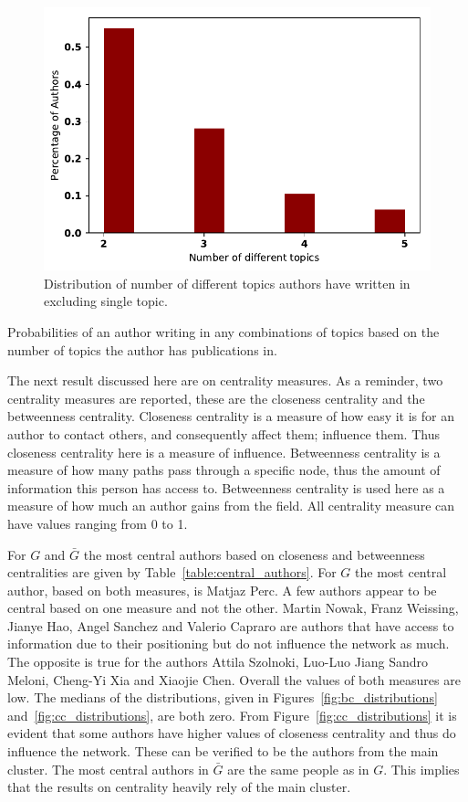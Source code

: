 \documentclass{article}
\theoremstyle{definition}
\begin{document}
\begin{figure}[!hbtp]
    \centering
    \includegraphics[width=.45\textwidth]{./assets/images/percentage_of_authors_different_topic.pdf}
    \caption{Distribution of number of different topics authors have written in
    excluding single topic.}
    \label{fig:different_topics_per_author}
\end{figure}

\begin{table}[!htbp]
    \begin{center}
    \resizebox{.55\textwidth}{!}{}
\end{center}
\caption{Probabilities of an author writing in any combinations of
topics based on the number of topics the author has publications in.}\label{table:topic_probabilities}
\end{table}

The next result discussed here are on centrality measures. As a reminder, two
centrality measures are reported, these are the closeness centrality and the
betweenness centrality. Closeness centrality is a measure of how easy it is for
an author to contact others, and consequently affect them; influence them. Thus
closeness centrality here is a measure of influence. Betweenness centrality is a
measure of how many paths pass through a specific node, thus the amount of
information this person has access to. Betweenness centrality is used here as a
measure of how much an author gains from the field. All centrality measure can
have values ranging from 0 to 1.

For \(G\) and \(\bar{G}\) the most central authors based on closeness and
betweenness centralities are given by Table~\ref{table:central_authors}. For \(G\) the
most central author, based on both measures, is Matjaz Perc. A
few authors appear to be central based on one measure and not the other. Martin
Nowak, Franz Weissing, Jianye Hao, Angel Sanchez and Valerio Capraro are authors
that have access to information due to their positioning but do not
influence the network as much. The opposite is true for the authors Attila
Szolnoki, Luo-Luo Jiang Sandro Meloni, Cheng-Yi Xia and Xiaojie Chen.
Overall the values of both measures are low. The medians of the distributions, given
in Figures~\ref{fig:bc_distributions} and~\ref{fig:cc_distributions}, are both zero.
From Figure~\ref{fig:cc_distributions} it is evident that some authors have
higher values of closeness centrality and thus do influence the network. These can be
verified to be the authors from the main cluster. The most central authors
in \(\bar{G}\) are the same people as in \(G\). This implies that
the results on centrality heavily rely of the main cluster.
\end{document}
